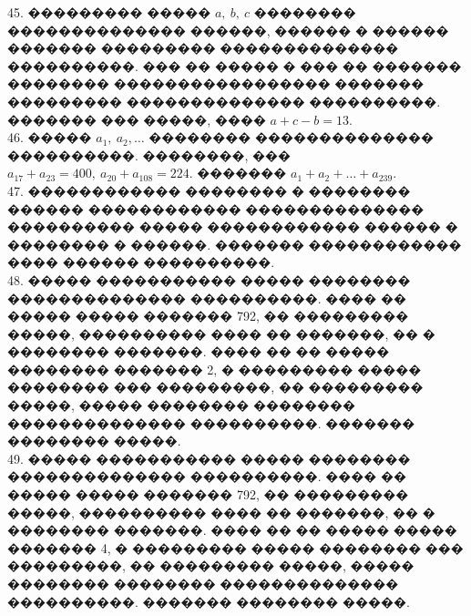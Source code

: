 \documentclass[12pt]{article}
\begin{document}
45. ��������� ����� $a,\ b,\ c$ �������� �������������� ������, ������ � ������ ������� ��������� �������������� ����������. ��� �� ����� � ��� �� ������� �������� ����������������� ������� ��������� �������������� ����������. ������� ��� �����, ���� $a+c-b=13.$\\
46. ����� $a_1,\ a_2,\ldots$ �������� �������������� ����������. ��������, ��� $a_{17}+a_{23}=400,\ a_{20}+a_{108}=224.$ ������� $a_{1}+a_2+\ldots+a_{239}.$\\
47. ������������ �������� � �������� ������ ������������ �������������� ���������� ����� ������������ ������ � �������� � ������. ������� ������������ ���� ������ ����������.\\
48. ����� ����������� ����� �������� �������������� ����������. ���� �� ����� ����� ������� 792, �� ��������� �����, ���������� ���� �� �������, �� � �������� �������. ���� �� �� ����� �������� ������� 2, � ��������� ����� �������� ��� ���������, �� ��������� �����, ����� �������� �������� �������������� ����������. ������� �������� �����.\\
49. ����� ����������� ����� �������� �������������� ����������. ���� �� ����� ����� ������� 792, �� ��������� �����, ���������� ���� �� �������, �� � �������� �������. ���� �� �� ����� ����� ������� 4, � ��������� ����� �������� ��� ���������, �� ��������� �����, ����� �������� �������� �������������� ����������. ������� �������� �����.
\newpage
\end{document}
